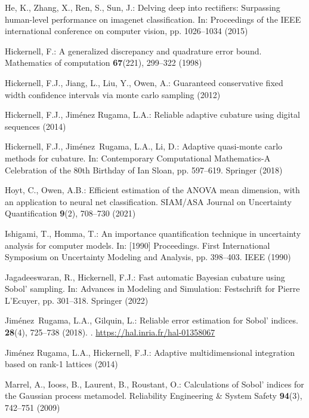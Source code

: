 \documentclass[graybox]{svmult}
\begin{document}
\begin{thebibliography}{10}
He, K., Zhang, X., Ren, S., Sun, J.: Delving deep into rectifiers: Surpassing
  human-level performance on imagenet classification.
\newblock In: Proceedings of the IEEE international conference on computer
  vision, pp. 1026--1034 (2015)

Hickernell, F.: A generalized discrepancy and quadrature error bound.
\newblock Mathematics of computation \textbf{67}(221), 299--322 (1998)

Hickernell, F.J., Jiang, L., Liu, Y., Owen, A.: Guaranteed conservative fixed
  width confidence intervals via monte carlo sampling (2012)

Hickernell, F.J., {Jim\'enez Rugama}, L.A.: Reliable adaptive cubature using
  digital sequences (2014)

Hickernell, F.J., Jim\'{e}nez~Rugama, L.A., Li, D.: Adaptive quasi-monte carlo
  methods for cubature.
\newblock In: Contemporary Computational Mathematics-A Celebration of the 80th
  Birthday of Ian Sloan, pp. 597--619. Springer (2018)

Hoyt, C., Owen, A.B.: Efficient estimation of the ANOVA mean dimension, with an
  application to neural net classification.
\newblock SIAM/ASA Journal on Uncertainty Quantification \textbf{9}(2),
  708--730 (2021)

Ishigami, T., Homma, T.: An importance quantification technique in uncertainty
  analysis for computer models.
\newblock In: [1990] Proceedings. First International Symposium on Uncertainty
  Modeling and Analysis, pp. 398--403. IEEE (1990)

Jagadeeswaran, R., Hickernell, F.J.: Fast automatic Bayesian cubature using
  Sobol’ sampling.
\newblock In: Advances in Modeling and Simulation: Festschrift for Pierre
  L'Ecuyer, pp. 301--318. Springer (2022)

Jim{\'e}nez~Rugama, L.A., Gilquin, L.: {Reliable error estimation for Sobol'
  indices}.
 \textbf{28}(4), 725--738 (2018).
\newblock {}.
\newblock \urlprefix\url{https://hal.inria.fr/hal-01358067}

{Jim\'enez Rugama}, L.A., Hickernell, F.J.: Adaptive multidimensional
  integration based on rank-1 lattices (2014)

Marrel, A., Iooss, B., Laurent, B., Roustant, O.: Calculations of Sobol' indices
  for the Gaussian process metamodel.
\newblock Reliability Engineering \& System Safety \textbf{94}(3), 742--751
  (2009)


\end{thebibliography}
\end{document}
